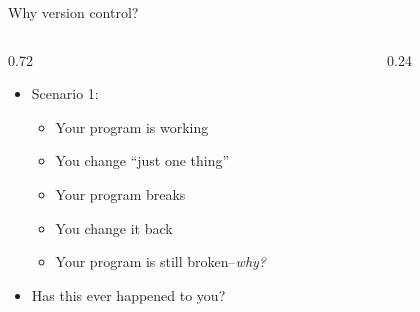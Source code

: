 \documentclass[aspectratio=169,11pt,t]{beamer}
\newcommand{\stack}[4]{%
  \node[ver] (#1a) at (#1,0) {v5};
  \node[ver] (#1b) at (#1,1) {v6};
  \node[#4] (#1c) at (#1,2) {#2};
  \draw[varr] (#1a) -- (#1b);
  \draw[varr] (#1b) -- (#1c);
  \node[font=\scriptsize] at (#1,-0.65) {#3};}
\begin{document}
\begin{frame}{Why version control?}
  \begin{columns}[T]
    \begin{column}{0.72\textwidth}
      \vskip4mm
      \begin{itemize}
        \item Scenario 1:
          \begin{itemize}
            \item Your program is working
            \item You change ``just one thing''
            \item Your program breaks
            \item You change it back
            \item Your program is still broken--\emph{why?}
          \end{itemize}
        \vskip3mm
        \item Has this ever happened to you?
      \end{itemize}
    \end{column}
    \begin{column}{0.24\textwidth}
      \vskip14mm
    \end{column}
  \end{columns}
\end{frame}
\end{document}
